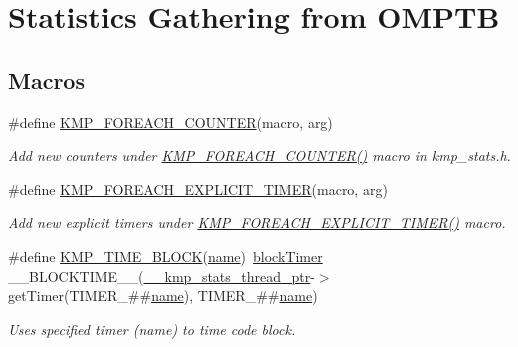 \hypertarget{group__STATS__GATHERING}{\section{Statistics Gathering from O\-M\-P\-T\-B}
\label{group__STATS__GATHERING}
}
\subsection*{Macros}
\begin{DoxyCompactItemize}
\item 
\#define \hyperlink{group__STATS__GATHERING_ga49fb18e6ba9abac7dcf1f9a202741b66}{K\-M\-P\-\_\-\-F\-O\-R\-E\-A\-C\-H\-\_\-\-C\-O\-U\-N\-T\-E\-R}(macro, arg)
\begin{DoxyCompactList}\small\item\em Add new counters under \hyperlink{group__STATS__GATHERING_ga49fb18e6ba9abac7dcf1f9a202741b66}{K\-M\-P\-\_\-\-F\-O\-R\-E\-A\-C\-H\-\_\-\-C\-O\-U\-N\-T\-E\-R()} macro in kmp\-\_\-stats.\-h. \end{DoxyCompactList}\item 
\#define \hyperlink{group__STATS__GATHERING_gab0bd69c3ce378f4f7079276311e034c0}{K\-M\-P\-\_\-\-F\-O\-R\-E\-A\-C\-H\-\_\-\-E\-X\-P\-L\-I\-C\-I\-T\-\_\-\-T\-I\-M\-E\-R}(macro, arg)
\begin{DoxyCompactList}\small\item\em Add new explicit timers under \hyperlink{group__STATS__GATHERING_gab0bd69c3ce378f4f7079276311e034c0}{K\-M\-P\-\_\-\-F\-O\-R\-E\-A\-C\-H\-\_\-\-E\-X\-P\-L\-I\-C\-I\-T\-\_\-\-T\-I\-M\-E\-R()} macro. \end{DoxyCompactList}\item 
\#define \hyperlink{group__STATS__GATHERING_ga62f4b6e3a4ba48c04b172b97df137839}{K\-M\-P\-\_\-\-T\-I\-M\-E\-\_\-\-B\-L\-O\-C\-K}(\hyperlink{ittnotify__static_8h_a1c34b35a4952969fef60192313bba34a}{name})~\hyperlink{classblockTimer}{block\-Timer} \-\_\-\-\_\-\-B\-L\-O\-C\-K\-T\-I\-M\-E\-\_\-\-\_\-(\hyperlink{kmp__stats_8h_ae8b6bdb1368ab875fdb8322ba2de5803}{\-\_\-\-\_\-kmp\-\_\-stats\-\_\-thread\-\_\-ptr}-\/$>$get\-Timer(T\-I\-M\-E\-R\-\_\-\#\#\hyperlink{ittnotify__static_8h_a1c34b35a4952969fef60192313bba34a}{name}), T\-I\-M\-E\-R\-\_\-\#\#\hyperlink{ittnotify__static_8h_a1c34b35a4952969fef60192313bba34a}{name})
\begin{DoxyCompactList}\small\item\em Uses specified timer (name) to time code block. \end{DoxyCompactList}\item 

\end{DoxyCompactItemize}
